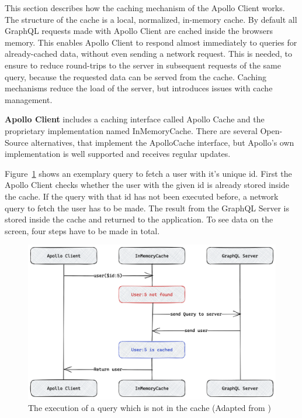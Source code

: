 This section describes how the caching mechanism of the Apollo Client works. The structure of the cache is a local, normalized, in-memory cache. By default all GraphQL requests made with Apollo Client are cached inside the browsers memory. This enables Apollo Client to respond almost immediately to queries for already-cached data, without even sending a network request. This is needed, to ensure to reduce round-trips to the server in subsequent requests of the same query, because the requested data can be served from the cache. \cite{misc:-:background:graphql:apollo-client-cache-overview} Caching mechanisms reduce the load of the server, but introduces issues with cache management.

\bigskip

\noindent \textbf{Apollo Client} includes a caching interface called Apollo Cache and the proprietary implementation named InMemoryCache. There are several Open-Source alternatives, that implement the ApolloCache interface, but Apollo's own implementation is well supported and receives regular updates.

\bigskip

\noindent Figure~\ref{fig:background:graphql:user-query-first-time} shows an exemplary query to fetch a user with it's unique id. First the Apollo Client checks whether the user with the given id is already stored inside the cache. If the query with that id has not been executed before, a network query to fetch the user has to be made. The result from the GraphQL Server is stored inside the cache and returned to the application. To see data on the screen, four steps have to be made in total. \cite{misc:-:background:graphql:apollo-client-cache-overview}

\ifshowImages
\begin{figure}[H]
    \centering
    \includegraphics[width=0.6\linewidth]{images/background/apollo/apollo-client-basic-cache.png}
    \caption{The execution of a query which is not in the cache (Adapted from \cite{misc:-:background:graphql:apollo-client-cache-overview})}\label{fig:background:graphql:user-query-first-time}
\end{figure}
\fi


